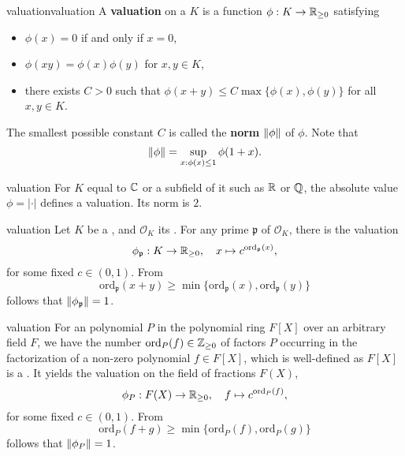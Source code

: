 \begin{topic}{valuation}{valuation}
    A \textbf{valuation} on a  $K$ is a function $\phi : K \to \mathbb{R}_{\ge 0}$ satisfying
    \begin{itemize}
        \item $\phi(x) = 0$ if and only if $x = 0$,
        \item $\phi(xy) = \phi(x) \phi(y)$ for $x, y \in K$,
        \item there exists $C > 0$ such that $\phi(x + y) \le C \max \{ \phi(x), \phi(y) \}$ for all $x, y \in K$.
    \end{itemize}
    The smallest possible constant $C$ is called the \textbf{norm} $\left\|\phi\right\|$ of $\phi$. Note that
    \[ \left\|\phi\right\| = \sup_{x : \phi(x) \le 1} \phi(1 + x) . \]
\end{topic}

\begin{example}{valuation}
    For $K$ equal to $\mathbb{C}$ or a subfield of it such as $\mathbb{R}$ or $\mathbb{Q}$, the absolute value $\phi = |\cdot|$ defines a valuation. Its norm is $2$.
\end{example}

\begin{example}{valuation}
    Let $K$ be a , and $\mathcal{O}_K$ its . For any prime $\mathfrak{p}$ of $\mathcal{O}_K$, there is the valuation
    \[ \phi_\mathfrak{p} : K \to \mathbb{R}_{\ge 0}, \quad x \mapsto c^{\text{ord}_\mathfrak{p}(x)} , \]
    for some fixed $c \in (0, 1)$. From
    \[ \text{ord}_\mathfrak{p}(x + y) \ge \min \{ \text{ord}_\mathfrak{p}(x), \text{ord}_\mathfrak{p}(y) \} \]
    follows that $\left\|\phi_\mathfrak{p}\right\| = 1$.
\end{example}

\begin{example}{valuation}
    For an  polynomial $P$ in the polynomial ring $F[X]$ over an arbitrary field $F$, we have the number $\text{ord}_P(f) \in \mathbb{Z}_{\ge 0}$ of factors $P$ occurring in the factorization of a non-zero polynomial $f \in F[X]$, which is well-defined as $F[X]$ is a . It yields the valuation on the field of fractions $F(X)$,
    \[ \phi_P : F(X) \to \mathbb{R}_{\ge 0}, \quad f \mapsto c^{\text{ord}_P(f)} ,  \]
    for some fixed $c \in (0, 1)$. From
    \[ \text{ord}_P(f + g) \ge \min \{ \text{ord}_P(f), \text{ord}_P(g) \} \]
    follows that $\left\|\phi_P\right\| = 1$.
\end{example}

